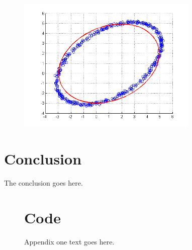 \documentclass[journal]{IEEEtran}
\begin{document}
\begin{figure}
\centering
\includegraphics[width=3.4in]{figures/nd-fittedEllipse.png}
\caption{}
\label{figFE}
\end{figure}


\section{Conclusion}
The conclusion goes here.








\appendices

\begin{figure}[p]
\section{Code}
Appendix one text goes here.
\end{figure}




\end{document}

